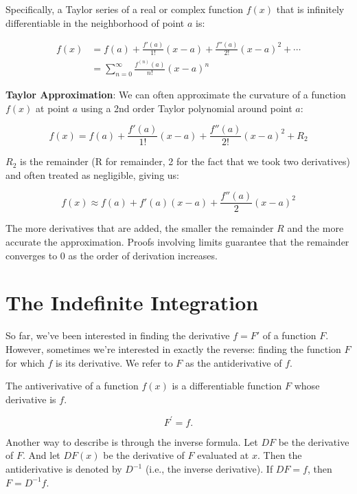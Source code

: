 \documentclass[]{book}
\theoremstyle{definition}
\theoremstyle{definition}
\theoremstyle{definition}
\theoremstyle{remark}
\let\BeginKnitrBlock\begin \let\EndKnitrBlock\end
\begin{document}
Specifically, a Taylor series of a real or complex function \(f(x)\)
that is infinitely differentiable in the neighborhood of point \(a\) is:

\begin{align*}
    f(x) &= f(a) + \frac{f'(a)}{1!} (x-a) +  \frac{f''(a)}{2!} (x-a)^2 + \cdots\\
     &= \sum_{n=0}^\infty \frac{f^{(n)} (a)}{n!} (x-a)^n
\end{align*}

\textbf{Taylor Approximation}: We can often approximate the curvature of
a function \(f(x)\) at point \(a\) using a 2nd order Taylor polynomial
around point \(a\):

\[f(x) = f(a) + \frac{f'(a)}{1!} (x-a) +  \frac{f''(a)}{2!} (x-a)^2
+ R_2\]

\(R_2\) is the remainder (R for remainder, 2 for the fact that we took
two derivatives) and often treated as negligible, giving us:

\[f(x) \approx f(a) + f'(a)(x-a) +  \dfrac{f''(a)}{2} (x-a)^2\]

The more derivatives that are added, the smaller the remainder \(R\) and
the more accurate the approximation. Proofs involving limits guarantee
that the remainder converges to 0 as the order of derivation increases.

\section{The Indefinite Integration}\label{the-indefinite-integration}

So far, we've been interested in finding the derivative \(f=F'\) of a
function \(F\). However, sometimes we're interested in exactly the
reverse: finding the function \(F\) for which \(f\) is its derivative.
We refer to \(F\) as the antiderivative of \(f\).

\BeginKnitrBlock{definition}[Antiderivative]
\protect\hypertarget{def:unnamed-chunk-20}{}{\label{def:unnamed-chunk-20}
{} }The antiverivative of a function
\(f(x)\) is a differentiable function \(F\) whose derivative is \(f\).

\[F^\prime = f.\]
\EndKnitrBlock{definition}

Another way to describe is through the inverse formula. Let \(DF\) be
the derivative of \(F\). And let \(DF(x)\) be the derivative of \(F\)
evaluated at \(x\). Then the antiderivative is denoted by \(D^{-1}\)
(i.e., the inverse derivative). If \(DF=f\), then \(F=D^{-1}f\).
\end{document}
